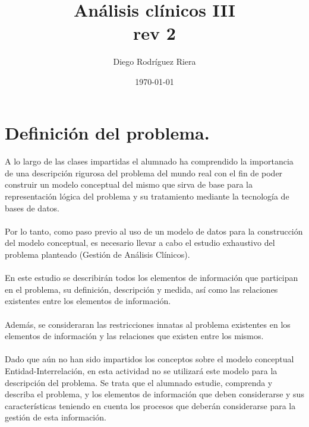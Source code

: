 \documentclass[a4paper,10pt]{article}
\title{Análisis clínicos III\\{\small rev 2}}
\author{Diego Rodríguez Riera}
\date{\today}
\begin{document}
\maketitle
\pagebreak
\tableofcontents
\pagebreak

\section{Definición del problema.}
\paragraph{}
A lo largo de las clases impartidas el alumnado ha comprendido la importancia de una descripción rigurosa del problema del mundo real con el fin de poder construir un modelo conceptual del mismo que sirva de base para la representación lógica del problema y su tratamiento mediante la tecnología de bases de datos.
\paragraph{}
Por lo tanto, como paso previo al uso de un modelo de datos para la construcción del modelo conceptual, es necesario llevar a cabo el estudio exhaustivo del problema planteado (Gestión de Análisis Clínicos).
\paragraph{}
En este estudio se describirán todos los elementos de información que participan en el problema, su definición, descripción y medida, así como las relaciones existentes entre los elementos de información.
\paragraph{}
Además, se consideraran las restricciones innatas al problema existentes en los elementos de información y las relaciones que existen entre los mismos.
\paragraph{}
Dado que aún no han sido impartidos los conceptos sobre el modelo conceptual Entidad-Interrelación, en esta actividad no se utilizará este modelo para la descripción del problema. Se trata que el alumnado estudie, comprenda y describa el problema, y los elementos de información que deben considerarse y sus características teniendo en cuenta los procesos que deberán considerarse para la gestión de esta información.
\pagebreak
\end{document}
